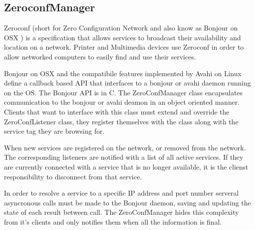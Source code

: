 \subsection{ZeroconfManager}

Zeroconf (short for Zero Configuration Network and also know as Bonjour on OSX ) is a specification that allows services to broadcast their availability and location on a network. Printer and Multimedia devices use Zeroconf in order to allow networked computers to easily find and use their services.

Bonjour on OSX and the compatibile features implemented by Avahi on Linux define a callback based API that interfaces to a bonjour or avahi daemon running on the OS. The Bonjour API is in C. The ZeroConfManager class encapsulates communication to the bonjour or avahi deamon in an object oriented manner. Clients that want to interface with this class must extend and override the ZeroConfListener class, they register themselves with the class along with the service tag they are browsing for.

When new services are registered on the network, or removed from the network. The corresponding listeners are notified with a list of all active services. If they are currently connected with a service that is no longer available, it is the clienst responsibility to disconnect from that service.

In order to resolve a service to a specific IP address and port number serveral asyncronous calls must be made to the Bonjour daemon, saving and updating the state of each result between call. The ZeroConfManager hides this complexity from it's clients and only notifies them when all the information is final.




